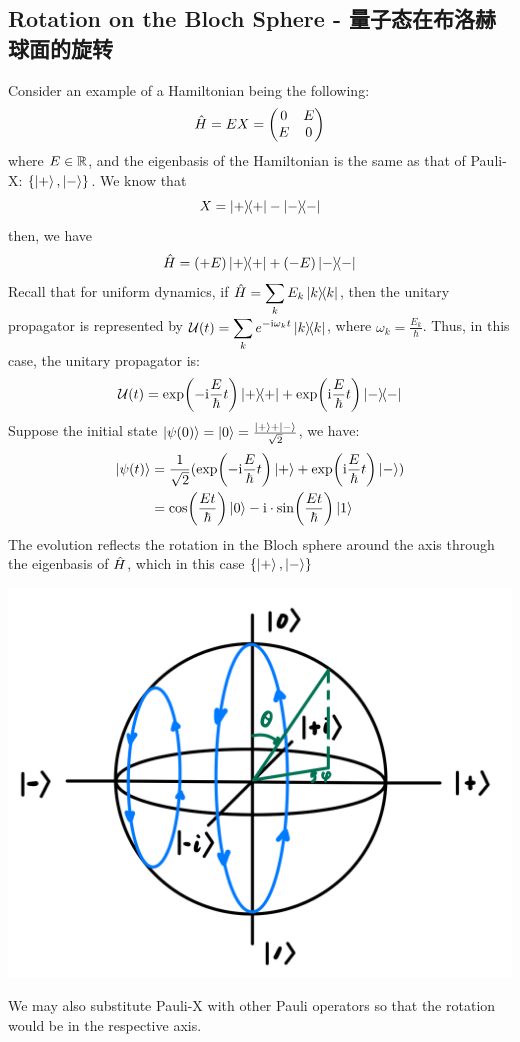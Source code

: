\subsection{Rotation on the Bloch Sphere - 量子态在布洛赫球面的旋转}
Consider an example of a Hamiltonian being the following:
$$\hat{H} = EX = \begin{pmatrix}
    0 & E \\
    E & 0
\end{pmatrix}$$
where $E \in \mathbb{R}$, and the eigenbasis of the Hamiltonian is the same as that of Pauli-X: $\{\ket{+}, \ket{-}\}$. We know that
$$X = \dyad{+} - \dyad{-}$$
then, we have
$$\hat{H} = (+E)\ketbra{+}{+} + (-E)\ketbra{-}{-}$$
Recall that for uniform dynamics, if $\displaystyle \hamiltonian = \Sumi{k}E_k \dyad{k}$, then the unitary propagator is represented by $\displaystyle \opuni(t) = \Sumi{k}e^{-\imag \omega_k t} \dyad{k}$, where $\omega_k = \frac{E_k}{\hbar}$. Thus, in this case, the unitary propagator is:
$$\opuni(t) = \exp(-\imag \frac{E}{\hbar} t)\dyad{+} + \exp(\imag \frac{E}{\hbar} t)\dyad{-}$$
Suppose the initial state $\ket{\psi(0)} = \ket{0} = \frac{\ket{+} + \ket{-}}{\sqrt{2}}$, we have:
\begin{align*}
    \ket{\psi(t)} &= \frac{1}{\sqrt{2}}(\exp(-\mathrm{i} \frac{E}{\hbar} t)\ket{+} + \exp(\mathrm{i} \frac{E}{\hbar} t)\ket{-}) \\
    &= \cos(\frac{Et}{\hbar})\ket{0} - \mathrm{i} \cdot \sin(\frac{Et}{\hbar})\ket{1}
\end{align*}
The evolution reflects the rotation in the Bloch sphere around the axis through the eigenbasis of $\hat{H}$, which in this case $\{\ket{+}, \ket{-}\}$
\begin{center}
    \includegraphics[scale = 0.3]{bloch-sphere-rotation.png}
\end{center}
We may also substitute Pauli-X with other Pauli operators so that the rotation would be in the respective axis.

